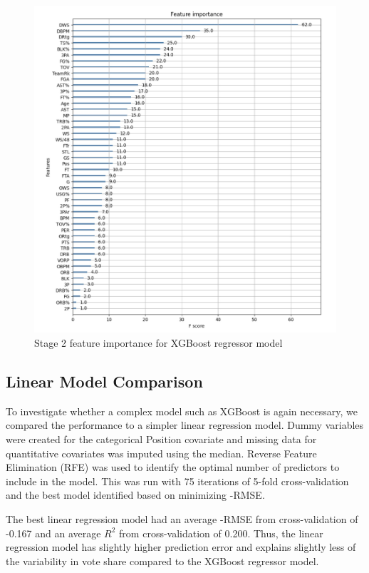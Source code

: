 \documentclass[letterpaper,titlepage]{article}
\begin{document}
    \begin{figure}[H]
        \centering
        \includegraphics[scale=0.27]{Stage_2_Feature_Importance.jpg}
        \caption{Stage 2 feature importance for XGBoost regressor model}
        \label{fig:Stage2FeatImp}
    \end{figure}

   \subsection{Linear Model Comparison}
    To investigate whether a complex model such as XGBoost is again necessary, we compared the performance to a simpler linear regression model. Dummy variables were created for the categorical Position covariate and missing data for quantitative covariates was imputed using the median. Reverse Feature Elimination (RFE) was used to identify the optimal number of predictors to include in the model. This was run with 75 iterations of 5-fold cross-validation and the best model identified based on minimizing -RMSE.

    The best linear regression model had an average -RMSE from cross-validation of -0.167 and an average \(R^2\) from cross-validation of 0.200. Thus, the linear regression model has slightly higher prediction error and explains slightly less of the variability in vote share compared to the XGBoost regressor model.
\end{document}
